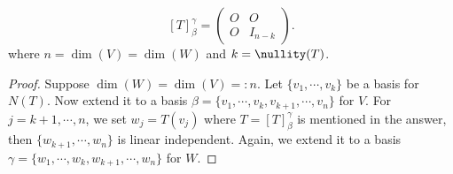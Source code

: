 \begin{Exercise}
	\begin{answer}
		$$
		[T]_{\beta}^{\gamma} = \begin{pmatrix}
		O & O \\
		O & I_{n-k}
		\end{pmatrix}.
		$$
		where $n=\dim(V)=\dim(W)$ and $k=\nullity(T)$.
	\end{answer}
	\begin{proof}
		Suppose $\dim(W) = \dim(V) =: n$. Let $\{v_1,\cdots,v_k\}$ be a basis for $N(T)$. Now extend it to a basis $\beta = \{v_1,\cdots,v_k,v_{k+1},\cdots,v_n\}$ for $V$. For $j=k+1,\cdots, n$, we set $w_j = T(v_j)$ where $T = [T]_{\beta}^{\gamma}$ is mentioned in the answer, then $\{w_{k+1},\cdots, w_n\}$ is linear independent. Again, we extend it to a basis $\gamma = \{w_1,\cdots, w_k,w_{k+1},\cdots,w_n\}$ for $W$.
	\end{proof}
\end{Exercise}